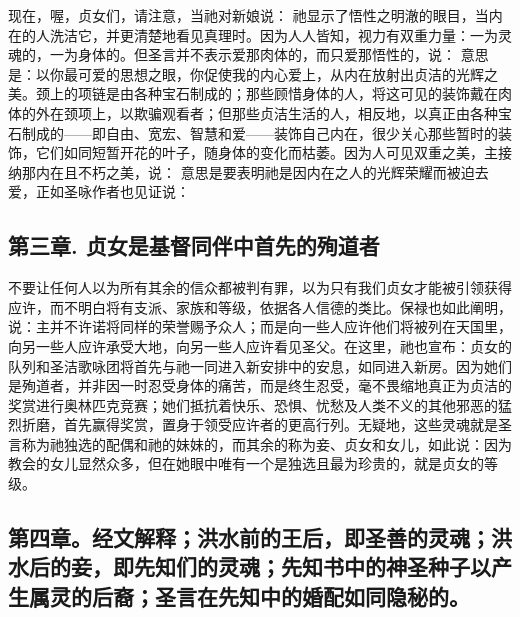 现在，喔，贞女们，请注意，当祂对新娘说： 祂显示了悟性之明澈的眼目，当内在的人洗洁它，并更清楚地看见真理时。因为人人皆知，视力有双重力量：一为灵魂的，一为身体的。但圣言并不表示爱那肉体的，而只爱那悟性的，说： 意思是：以你最可爱的思想之眼，你促使我的内心爱上，从内在放射出贞洁的光辉之美。颈上的项链是由各种宝石制成的；那些顾惜身体的人，将这可见的装饰戴在肉体的外在颈项上，以欺骗观看者；但那些贞洁生活的人，相反地，以真正由各种宝石制成的——即自由、宽宏、智慧和爱——装饰自己内在，很少关心那些暂时的装饰，它们如同短暂开花的叶子，随身体的变化而枯萎。因为人可见双重之美，主接纳那内在且不朽之美，说： 意思是要表明祂是因内在之人的光辉荣耀而被迫去爱，正如圣咏作者也见证说：\par


\subsection{第三章. 贞女是基督同伴中首先的殉道者}

不要让任何人以为所有其余的信众都被判有罪，以为只有我们贞女才能被引领获得应许，而不明白将有支派、家族和等级，依据各人信德的类比。保禄也如此阐明，说：主并不许诺将同样的荣誉赐予众人；而是向一些人应许他们将被列在天国里，向另一些人应许承受大地，向另一些人应许看见圣父。在这里，祂也宣布：贞女的队列和圣洁歌咏团将首先与祂一同进入新安排中的安息，如同进入新房。因为她们是殉道者，并非因一时忍受身体的痛苦，而是终生忍受，毫不畏缩地真正为贞洁的奖赏进行奥林匹克竞赛；她们抵抗着快乐、恐惧、忧愁及人类不义的其他邪恶的猛烈折磨，首先赢得奖赏，置身于领受应许者的更高行列。无疑地，这些灵魂就是圣言称为祂独选的配偶和祂的妹妹的，而其余的称为妾、贞女和女儿，如此说：因为教会的女儿显然众多，但在她眼中唯有一个是独选且最为珍贵的，就是贞女的等级。\par


\subsection{第四章。经文解释；洪水前的王后，即圣善的灵魂；洪水后的妾，即先知们的灵魂；先知书中的神圣种子以产生属灵的后裔；圣言在先知中的婚配如同隐秘的。}

